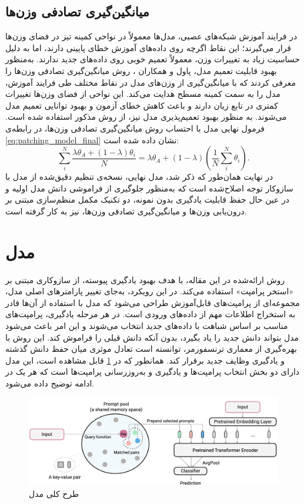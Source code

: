 \subsection{میانگین‌گیری تصادفی وزن‌ها}
در فرایند آموزش شبکه‌های عصبی، مدل‌ها معمولاً در نواحی کمینه تیز در فضای وزن‌ها قرار می‌گیرند؛ این نقاط اگرچه روی داده‌های آموزش خطای پایینی دارند، اما به دلیل حساسیت زیاد به تغییرات وزن، معمولاً تعمیم خوبی روی داده‌های جدید ندارند. به‌منظور بهبود قابلیت تعمیم مدل، پاول و همکاران \cite{flat-min}، روش میانگین‌گیری تصادفی وزن‌ها را معرفی کردند که با میانگین‌گیری از وزن‌های مدل در نقاط مختلف طی فرایند آموزش، مدل را به سمت کمینه مسطح هدایت می‌کند. این نواحی از فضای وزن‌ها تغییرات کمتری در تابع زیان دارند و باعث کاهش خطای آزمون و بهبود توانایی تعمیم مدل می‌شوند. به منظور بهبود تعمیم‌پذیری مدل  نیز، از روش مذکور استفاده شده است. فرمول نهایی مدل   با احتساب روش میانگین‌گیری تصادفی وزن‌ها، در رابطه‌ی \eqref{eq:patching_model_final} نشان داده شده است:
\begin{equation}\label{eq:patching_model_final}
	\sum_{i}^{N} \frac{\lambda \theta_{A} + (1 - \lambda) \theta_{i}}{N}
	= \lambda \theta_{A} + (1 - \lambda)
	\left( \frac{1}{N} \sum_{i}^{N} \theta_{i} \right).
\end{equation}
در نهایت همان‌طور که ذکر شد، مدل  نهایی، نسخه‌ی تنظیم دقیق‌شده از مدل  با سازوکار توجه اصلاح‌شده است که به‌منظور جلوگیری از فراموشی دانش مدل اولیه و در عین حال حفظ قابلیت یادگیری بدون نمونه، دو تکنیک مکمل منظم‌سازی مبتنی بر درون‌یابی وزن‌ها و میانگین‌گیری تصادفی وزن‌ها، نیز به کار گرفته است.
\section{مدل }
روش ارائه‌شده در این مقاله، با هدف بهبود یادگیری پیوسته، از سازوکاری مبتنی بر «استخر پرامپت‌» استفاده می‌کند. در این رویکرد، به‌جای تغییر پارامتر‌های اصلی مدل، مجموعه‌ای از پرامپت‌های قابل‌آموزش طراحی می‌شود که مدل با استفاده از آن‌ها قادر به استخراج اطلاعات مهم از داده‌های ورودی است. در هر مرحله یادگیری، پرامپت‌های مناسب بر اساس شباهت با داده‌های جدید انتخاب می‌شوند و این امر باعث می‌شود مدل بتواند دانش جدید را یاد بگیرد، بدون آنکه دانش قبلی را فراموش کند. این روش با بهره‌گیری از معماری ترنسفورمر، توانسته است تعادل موثری میان حفظ دانش گذشته و یادگیری وظایف جدید برقرار کند. همانطور که در \cref{fig.32} قابل مشاهده است، این مدل دارای دو بخش انتخاب پرامپت‌ها و یادگیری و به‌روزرسانی پرامپت‌ها است که هر یک در ادامه توضیح داده‌ می‌شود.
‌\begin{figure}
	\centering\includegraphics[scale=.38]{Images/Chapter3/l2p.png}
	\caption[]{ طرح کلی مدل  \cite{l2p}}
	\label{fig.32}
\end{figure}

